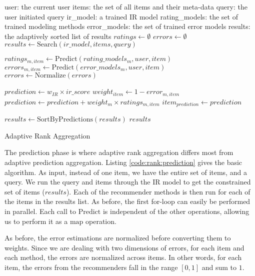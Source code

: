 \begin{algorithm}[t]
  \begin{algorithmic}[1]
  \REQUIRE user: the current user
  \REQUIRE items: the set of all items and their meta-data
  \REQUIRE query: the user initiated query
  \REQUIRE ir\_model: a trained IR model
  \REQUIRE rating\_models: the set of trained modeling methods 
  \REQUIRE error\_models: the set of trained error models
  \ENSURE  results: the adaptively sorted list of results
    \STATE $ratings \gets \emptyset$
    \STATE $errors  \gets \emptyset$
    \STATE $results \gets \mathrm{Search}(ir\_model, items, query)$
    
        \STATE $ratings_{m,item} \gets \mathrm{Predict}(rating\_models_m, user, item)$
        \STATE $errors_{m,item}  \gets \mathrm{Predict}(error\_models_m, user, item)$
      \ENDFOR 
    \ENDFOR
    \STATE $errors \gets \mathrm{Normalize}(errors)$

      \STATE $prediction \gets w_{IR} \times ir\_score$
        \STATE $weight_{item} \gets 1 - error_{m,item}$
        \STATE $prediction \gets prediction + weight_m \times ratings_{m,item}$
      \ENDFOR
      \STATE $item_{prediction} \gets prediction$
    \ENDFOR
    
    \STATE $results \gets \mathrm{SortByPredictions}(results)$
  \RETURN $results$

  \end{algorithmic}
  \caption[Adaptive Rank Aggregation]{Adaptive Rank Aggregation}
  \label{code:rank:prediction}
\end{algorithm}

The prediction phase is where adaptive rank aggregation differs most from adaptive prediction aggregation.
Listing \ref{code:rank:prediction} gives the basic algorithm.
As input, instead of one item, we have the entire set of items, and a query.
We run the query and items through the IR model to get the constrained set of items ($results$).
Each of the recommender methods is then run for each of the items in the results list.
As before, the first for-loop can easily be performed in parallel.
Each call to $\mathrm{Predict}$ is independent of the other operations,
allowing us to perform it as a $\mathrm{map}$ operation.

As before, the error estimations are normalized before converting them to weights.
Since we are dealing with two dimensions of errors, for each item and each method,
the errors are normalized across items.
In other words, for each item, the errors from the recommenders fall in the range $[0,1]$ and sum to $1$.

